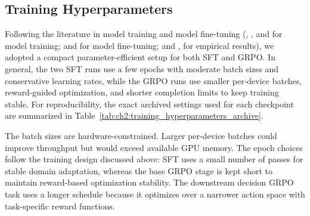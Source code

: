 \subsection*{Training Hyperparameters}\label{ch2:sec:parameter}


Following the literature in model training and model fine-tuning (\cite{gpt2018}, \cite{meta2024llama3}, and \cite{yang2025qwen3} for model training; \cite{howard2018universal} and \cite{ding2023parameter} for model fine-tuning; and \cite{li2020rethinking}, \cite{vm2024fine} for empirical results), we adopted a compact parameter-efficient setup for both SFT and GRPO. In general, the two SFT runs use a few epochs with moderate batch sizes and conservative learning rates, while the GRPO runs use smaller per-device batches, reward-guided optimization, and shorter completion limits to keep training stable. For reproducibility, the exact archived settings used for each checkpoint are summarized in Table~\ref{tab:ch2:training_hyperparameters_archive}.

The batch sizes are hardware-constrained. Larger per-device batches could improve throughput but would exceed available GPU memory. The epoch choices follow the training design discussed above: SFT uses a small number of passes for stable domain adaptation, whereas the base GRPO stage is kept short to maintain reward-based optimization stability. The downstream decision GRPO task uses a longer schedule because it optimizes over a narrower action space with task-specific reward functions.

